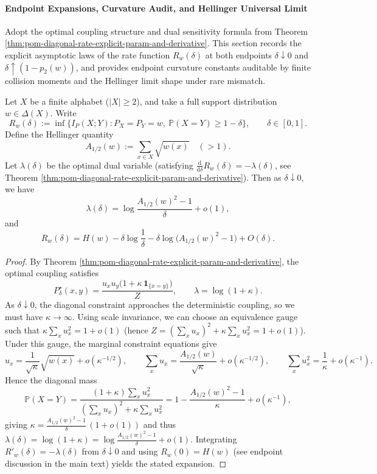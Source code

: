 
\paragraph{Endpoint Expansions, Curvature Audit, and Hellinger Universal Limit}
Adopt the optimal coupling structure and dual sensitivity formula from Theorem \ref{thm:pom-diagonal-rate-explicit-param-and-derivative}.
This section records the explicit asymptotic laws of the rate function \(R_w(\delta)\) at both endpoints \(\delta\downarrow 0\) and \(\delta\uparrow (1-p_2(w))\), and provides endpoint curvature constants auditable by finite collision moments and the Hellinger limit shape under rare mismatch.

\begin{theorem}\label{thm:pom-diagonal-rate-small-distortion-hellinger-endpoint}
Let \(X\) be a finite alphabet (\(|X|\ge2\)), and take a full support distribution \(w\in\Delta(X)\).
Write
\[
R_w(\delta):=\inf\{I_P(X;Y):P_X=P_Y=w,\ \mathbb P(X=Y)\ge 1-\delta\},\qquad \delta\in[0,1].
\]
Define the Hellinger quantity
\[
A_{1/2}(w):=\sum_{x\in X}\sqrt{w(x)}\quad(>1).
\]
Let \(\lambda(\delta)\) be the optimal dual variable (satisfying \(\frac{\mathrm d}{\mathrm d\delta}R_w(\delta)=-\lambda(\delta)\), see Theorem \ref{thm:pom-diagonal-rate-explicit-param-and-derivative}).
Then as \(\delta\downarrow 0\), we have
\[
\lambda(\delta)=\log\frac{A_{1/2}(w)^2-1}{\delta}+o(1),
\]
and
\[
R_w(\delta)
=H(w)-\delta\log\frac{1}{\delta}-\delta\log\bigl(A_{1/2}(w)^2-1\bigr)+O(\delta).
\]
\end{theorem}
\begin{proof}
By Theorem \ref{thm:pom-diagonal-rate-explicit-param-and-derivative}, the optimal coupling satisfies
\[
P^\star_\delta(x,y)=\frac{u_xu_y\bigl(1+\kappa\,\mathbf 1_{\{x=y\}}\bigr)}{Z},
\qquad \lambda=\log(1+\kappa).
\]
As \(\delta\downarrow 0\), the diagonal constraint approaches the deterministic coupling, so we must have \(\kappa\to\infty\).
Using scale invariance, we can choose an equivalence gauge such that
\(
\kappa\sum_x u_x^2=1+o(1)
\)
(hence \(Z=(\sum_x u_x)^2+\kappa\sum_x u_x^2=1+o(1)\)).
Under this gauge, the marginal constraint equations give
\[
u_x=\frac{1}{\sqrt{\kappa}}\sqrt{w(x)}+o(\kappa^{-1/2}),
\qquad
\sum_x u_x=\frac{A_{1/2}(w)}{\sqrt{\kappa}}+o(\kappa^{-1/2}),
\qquad
\sum_x u_x^2=\frac{1}{\kappa}+o(\kappa^{-1}).
\]
Hence the diagonal mass
\[
\mathbb P(X=Y)
=\frac{(1+\kappa)\sum_x u_x^2}{(\sum_x u_x)^2+\kappa\sum_x u_x^2}
=1-\frac{A_{1/2}(w)^2-1}{\kappa}+o(\kappa^{-1}),
\]
giving
\(
\kappa=\frac{A_{1/2}(w)^2-1}{\delta}\,(1+o(1))
\)
and thus
\(
\lambda(\delta)=\log(1+\kappa)=\log\frac{A_{1/2}(w)^2-1}{\delta}+o(1)
\).
Integrating \(R'_w(\delta)=-\lambda(\delta)\) from \(\delta\downarrow 0\) and using \(R_w(0)=H(w)\) (see endpoint discussion in the main text) yields the stated expansion.
\end{proof}

